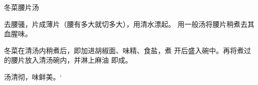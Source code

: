 \begin{recipe}{冬菜腰片汤}

\ingredients




\cooking

去腰骚，片成薄片（腰有多大就切多大），用清水漂起。 用一般汤将腰片稍煮去其血腥味。

冬菜在清汤内稍煮后，即加进胡椒面、味精、食盐，煮 开后盛入碗中。再将煮过的腰片放入清汤碗内，并淋上麻油 即成。

\notes

汤清彻，味鲜美。‘

\end{recipe}

